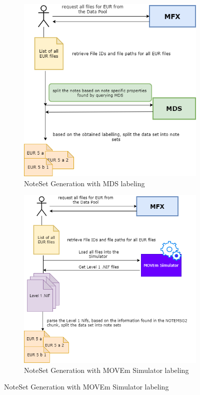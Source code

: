\begin{figure}
\centering
\begin{subfigure}[b]{0.45\textwidth}
   \includegraphics[width=1\linewidth]{images/label_mds_approach.png}
   \caption{NoteSet Generation with MDS labeling}
   \label{fig:ns_mds} 
\end{subfigure}

\begin{subfigure}[b]{0.45\textwidth}
   \includegraphics[width=1\linewidth]{images/label_simulator_approach.png}
   \caption{NoteSet Generation with MOVEm Simulator labeling}
   \label{fig:ns_sim}
\end{subfigure}


\end{figure}

